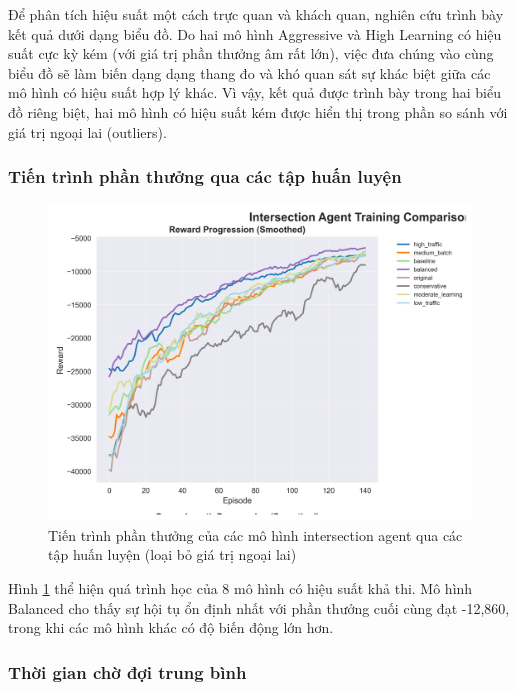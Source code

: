 Để phân tích hiệu suất một cách trực quan và khách quan, nghiên cứu trình bày
kết quả dưới dạng biểu đồ. Do hai mô hình Aggressive và High Learning có hiệu suất
cực kỳ kém (với giá trị phần thưởng âm rất lớn), việc đưa chúng vào cùng biểu đồ
sẽ làm biến dạng dạng thang đo và khó quan sát sự khác biệt giữa các mô hình có hiệu
suất hợp lý khác. Vì vậy, kết quả được trình bày trong hai biểu đồ riêng biệt, hai mô hình có hiệu suất kém được hiển thị trong phần so sánh với giá trị ngoại lai (outliers).

\subsubsection{Tiến trình phần thưởng qua các tập huấn luyện}

\begin{figure}[!htp]
    \centering
    \includegraphics[width=\textwidth]{
        figures/individual_plots/intersection_filtered_reward_progress.png
    }
    \caption{Tiến trình phần thưởng của các mô hình intersection agent qua các
    tập huấn luyện (loại bỏ giá trị ngoại lai)}
    \label{fig:intersection_filtered_reward_progress}
\end{figure}

Hình \ref{fig:intersection_filtered_reward_progress} thể hiện quá trình học của
8 mô hình có hiệu suất khả thi. Mô hình Balanced cho thấy sự hội tụ ổn định nhất
với phần thưởng cuối cùng đạt -12,860, trong khi các mô hình khác có độ biến động lớn
hơn.

\subsubsection{Thời gian chờ đợi trung bình}

